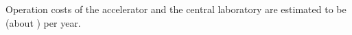 Operation costs of the accelerator and the central laboratory are estimated to be  (about ) per year.















